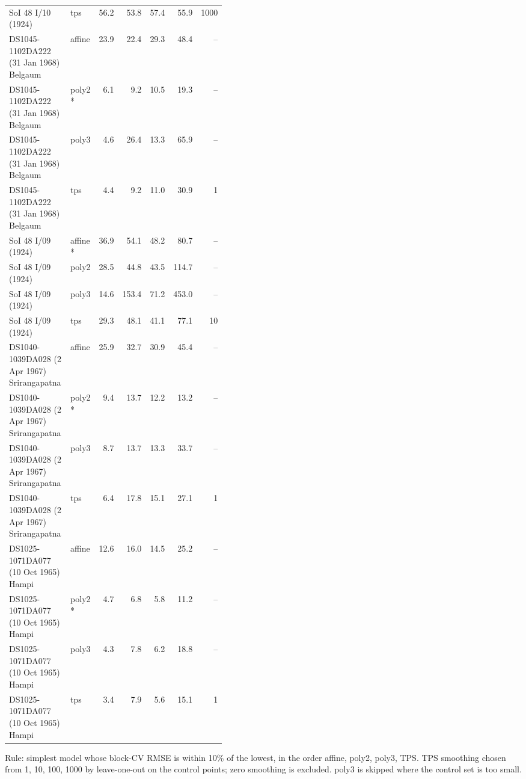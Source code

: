 \begin{table}[!htbp]
\begin{adjustbox}{max width=\linewidth}
\begin{tabular}{>{\raggedright\arraybackslash}p{0.42\linewidth}lrrrrr}
SoI 48 I/10 (1924) & tps & 56.2 & 53.8 & 57.4 & 55.9 & 1000 \\
DS1045-1102DA222 (31 Jan 1968) Belgaum & affine & 23.9 & 22.4 & 29.3 & 48.4 & -- \\
DS1045-1102DA222 (31 Jan 1968) Belgaum & poly2 * & 6.1 & 9.2 & 10.5 & 19.3 & -- \\
DS1045-1102DA222 (31 Jan 1968) Belgaum & poly3 & 4.6 & 26.4 & 13.3 & 65.9 & -- \\
DS1045-1102DA222 (31 Jan 1968) Belgaum & tps & 4.4 & 9.2 & 11.0 & 30.9 & 1 \\
SoI 48 I/09 (1924) & affine * & 36.9 & 54.1 & 48.2 & 80.7 & -- \\
SoI 48 I/09 (1924) & poly2 & 28.5 & 44.8 & 43.5 & 114.7 & -- \\
SoI 48 I/09 (1924) & poly3 & 14.6 & 153.4 & 71.2 & 453.0 & -- \\
SoI 48 I/09 (1924) & tps & 29.3 & 48.1 & 41.1 & 77.1 & 10 \\
DS1040-1039DA028 (2 Apr 1967) Srirangapatna & affine & 25.9 & 32.7 & 30.9 & 45.4 & -- \\
DS1040-1039DA028 (2 Apr 1967) Srirangapatna & poly2 * & 9.4 & 13.7 & 12.2 & 13.2 & -- \\
DS1040-1039DA028 (2 Apr 1967) Srirangapatna & poly3 & 8.7 & 13.7 & 13.3 & 33.7 & -- \\
DS1040-1039DA028 (2 Apr 1967) Srirangapatna & tps & 6.4 & 17.8 & 15.1 & 27.1 & 1 \\
DS1025-1071DA077 (10 Oct 1965) Hampi & affine & 12.6 & 16.0 & 14.5 & 25.2 & -- \\
DS1025-1071DA077 (10 Oct 1965) Hampi & poly2 * & 4.7 & 6.8 & 5.8 & 11.2 & -- \\
DS1025-1071DA077 (10 Oct 1965) Hampi & poly3 & 4.3 & 7.8 & 6.2 & 18.8 & -- \\
DS1025-1071DA077 (10 Oct 1965) Hampi & tps & 3.4 & 7.9 & 5.6 & 15.1 & 1 \\
\bottomrule
\end{tabular}
\end{adjustbox}
\par\smallskip\parbox{\linewidth}{\scriptsize Rule: simplest model whose block-CV RMSE is within 10\% of the lowest, in the order affine, poly2, poly3, TPS. TPS smoothing chosen from 1, 10, 100, 1000 by leave-one-out on the control points; zero smoothing is excluded. poly3 is skipped where the control set is too small.}
\end{table}
